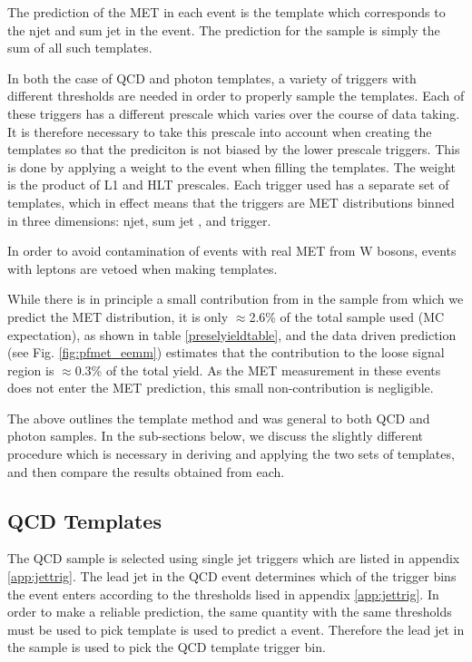 The prediction of the MET in each \Z event is the template which corresponds to the njet and 
sum jet \pt in the \Z event. The prediction for the \Z sample is simply the sum of all such templates.

In both the case of QCD and photon templates, a variety of triggers with different \pt thresholds 
are needed in order to properly sample the templates. Each of these triggers has a different prescale
which varies over the course of data taking. It is therefore necessary to take this prescale into
account when creating the templates so that the prediciton is not biased by the lower prescale 
triggers. This is done by applying a weight to the event when filling the templates. The weight 
is the product of L1 and HLT prescales. Each trigger used has a separate set of templates, which 
in effect means that the triggers are MET distributions binned in three dimensions: njet, 
sum jet \pt, and trigger.

In order to avoid contamination of events with real MET from W bosons, events with leptons 
are vetoed when making templates.

While there is in principle a small contribution from \ttbar in the \Z sample from 
which we predict the MET distribution, it is only $\approx$2.6\% of the total sample used
(MC expectation),
as shown in table \ref{preselyieldtable}, and the data driven prediction (see Fig. 
\ref{fig:pfmet_eemm}) estimates that the \ttbar contribution to the loose signal 
region is $\approx$0.3\% of the total \Z yield. As the MET measurement in these events 
does not enter the MET prediction, this small non-\Z contribution is negligible.

The above outlines the template method and was general to both QCD and photon samples. In the 
sub-sections below, we discuss the slightly different procedure which is necessary in deriving 
and applying the two sets of templates, and then compare the results obtained from each.


\subsection{QCD Templates}
\label{sec:templatesqcd}

The QCD sample is selected using single jet triggers which are listed in appendix \ref{app:jettrig}. 
The lead jet \pt in the QCD event determines which of the trigger bins the event enters according 
to the thresholds lised in appendix \ref{app:jettrig}. In order to make a reliable prediction, 
the same quantity with the same thresholds must be used to pick template is used to predict 
a \Z event. Therefore the lead jet \pt in the \Z sample is used to pick the QCD template trigger bin.

